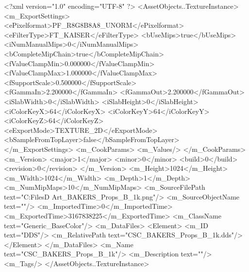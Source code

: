 <?xml version="1.0" encoding="UTF-8" ?>
<AssetObjects..TextureInstance>
	<m_ExportSettings>
		<ePixelformat>PF_R8G8B8A8_UNORM</ePixelformat>
		<eFilterType>FT_KAISER</eFilterType>
		<bUseMips>true</bUseMips>
		<iNumManualMips>0</iNumManualMips>
		<bCompleteMipChain>true</bCompleteMipChain>
		<fValueClampMin>0.000000</fValueClampMin>
		<fValueClampMax>1.000000</fValueClampMax>
		<fSupportScale>0.500000</fSupportScale>
		<fGammaIn>2.200000</fGammaIn>
		<fGammaOut>2.200000</fGammaOut>
		<iSlabWidth>0</iSlabWidth>
		<iSlabHeight>0</iSlabHeight>
		<iColorKeyX>64</iColorKeyX>
		<iColorKeyY>64</iColorKeyY>
		<iColorKeyZ>64</iColorKeyZ>
		<eExportMode>TEXTURE_2D</eExportMode>
		<bSampleFromTopLayer>false</bSampleFromTopLayer>
	</m_ExportSettings>
	<m_CookParams>
		<m_Values/>
	</m_CookParams>
	<m_Version>
		<major>1</major>
		<minor>0</minor>
		<build>0</build>
		<revision>0</revision>
	</m_Version>
	<m_Height>1024</m_Height>
	<m_Width>1024</m_Width>
	<m_Depth>1</m_Depth>
	<m_NumMipMaps>10</m_NumMipMaps>
	<m_SourceFilePath text="C:\Users\Shadow\Desktop\Working Files\3D Art\Textures\CSC_BAKERS_Props_B_1k.png"/>
	<m_SourceObjectName text=""/>
	<m_ImportedTime>0</m_ImportedTime>
	<m_ExportedTime>3167838225</m_ExportedTime>
	<m_ClassName text="Generic_BaseColor"/>
	<m_DataFiles>
		<Element>
			<m_ID text="DDS"/>
			<m_RelativePath text="CSC_BAKERS_Props_B_1k.dds"/>
		</Element>
	</m_DataFiles>
	<m_Name text="CSC_BAKERS_Props_B_1k"/>
	<m_Description text=""/>
	<m_Tags/>
</AssetObjects..TextureInstance>

